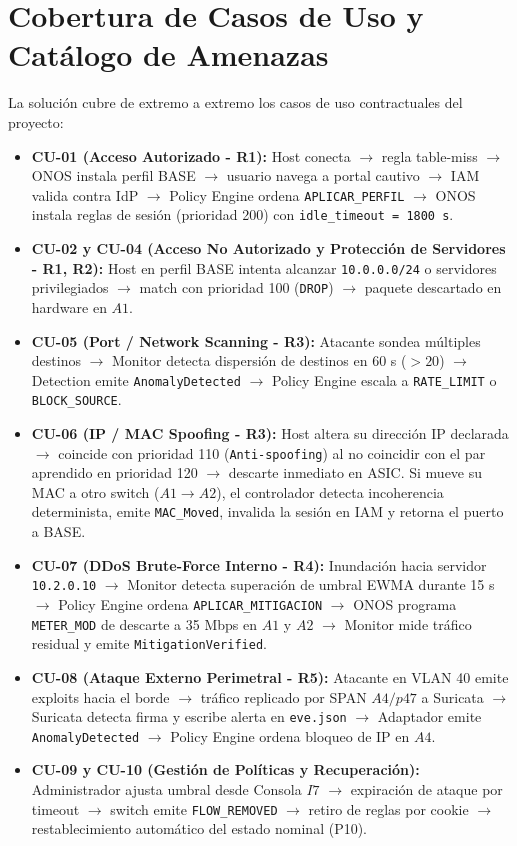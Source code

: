 \documentclass[11pt,a4paper]{report}
\begin{document}
\section{Cobertura de Casos de Uso y Catálogo de Amenazas}
La solución cubre de extremo a extremo los casos de uso contractuales del proyecto:
\begin{itemize}[leftmargin=*]
    \item \textbf{CU-01 (Acceso Autorizado - R1):} Host conecta $\rightarrow$ regla table-miss $\rightarrow$ ONOS instala perfil BASE $\rightarrow$ usuario navega a portal cautivo $\rightarrow$ IAM valida contra IdP $\rightarrow$ Policy Engine ordena \texttt{APLICAR\_PERFIL} $\rightarrow$ ONOS instala reglas de sesión (prioridad 200) con \texttt{idle\_timeout = 1800 s}.
    \item \textbf{CU-02 y CU-04 (Acceso No Autorizado y Protección de Servidores - R1, R2):} Host en perfil BASE intenta alcanzar \texttt{10.0.0.0/24} o servidores privilegiados $\rightarrow$ match con prioridad 100 (\texttt{DROP}) $\rightarrow$ paquete descartado en hardware en $A1$.
    \item \textbf{CU-05 (Port / Network Scanning - R3):} Atacante sondea múltiples destinos $\rightarrow$ Monitor detecta dispersión de destinos en 60 s ($>20$) $\rightarrow$ Detection emite \texttt{AnomalyDetected} $\rightarrow$ Policy Engine escala a \texttt{RATE\_LIMIT} o \texttt{BLOCK\_SOURCE}.
    \item \textbf{CU-06 (IP / MAC Spoofing - R3):} Host altera su dirección IP declarada $\rightarrow$ coincide con prioridad 110 (\texttt{Anti-spoofing}) al no coincidir con el par aprendido en prioridad 120 $\rightarrow$ descarte inmediato en ASIC. Si mueve su MAC a otro switch ($A1 \rightarrow A2$), el controlador detecta incoherencia determinista, emite \texttt{MAC\_Moved}, invalida la sesión en IAM y retorna el puerto a BASE.
    \item \textbf{CU-07 (DDoS Brute-Force Interno - R4):} Inundación hacia servidor \texttt{10.2.0.10} $\rightarrow$ Monitor detecta superación de umbral EWMA durante 15 s $\rightarrow$ Policy Engine ordena \texttt{APLICAR\_MITIGACION} $\rightarrow$ ONOS programa \texttt{METER\_MOD} de descarte a 35 Mbps en $A1$ y $A2$ $\rightarrow$ Monitor mide tráfico residual y emite \texttt{MitigationVerified}.
    \item \textbf{CU-08 (Ataque Externo Perimetral - R5):} Atacante en VLAN 40 emite exploits hacia el borde $\rightarrow$ tráfico replicado por SPAN $A4/p47$ a Suricata $\rightarrow$ Suricata detecta firma y escribe alerta en \texttt{eve.json} $\rightarrow$ Adaptador emite \texttt{AnomalyDetected} $\rightarrow$ Policy Engine ordena bloqueo de IP en $A4$.
    \item \textbf{CU-09 y CU-10 (Gestión de Políticas y Recuperación):} Administrador ajusta umbral desde Consola $I7$ $\rightarrow$ expiración de ataque por timeout $\rightarrow$ switch emite \texttt{FLOW\_REMOVED} $\rightarrow$ retiro de reglas por cookie $\rightarrow$ restablecimiento automático del estado nominal (P10).
\end{itemize}
\end{document}
